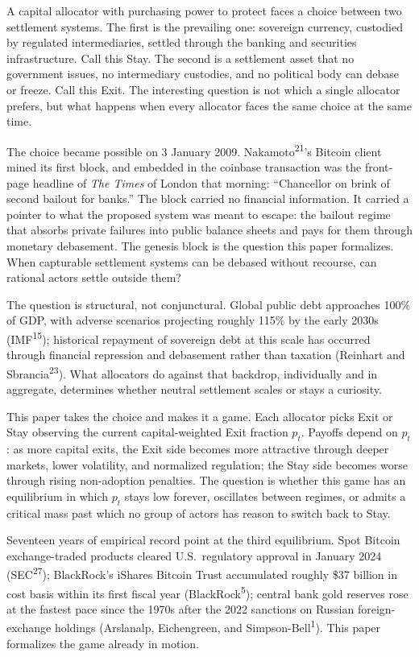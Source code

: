\documentclass[12pt]{article}
\theoremstyle{definition}
\theoremstyle{remark}
\begin{document}
A capital allocator with purchasing power to protect faces a choice between two settlement systems. The first is the prevailing one: sovereign currency, custodied by regulated intermediaries, settled through the banking and securities infrastructure. Call this Stay. The second is a settlement asset that no government issues, no intermediary custodies, and no political body can debase or freeze. Call this Exit. The interesting question is not which a single allocator prefers, but what happens when every allocator faces the same choice at the same time.

The choice became possible on 3 January 2009. Nakamoto\textsuperscript{21}'s Bitcoin client mined its first block, and embedded in the coinbase transaction was the front-page headline of \emph{The Times} of London that morning: ``Chancellor on brink of second bailout for banks.'' The block carried no financial information. It carried a pointer to what the proposed system was meant to escape: the bailout regime that absorbs private failures into public balance sheets and pays for them through monetary debasement. The genesis block is the question this paper formalizes. When capturable settlement systems can be debased without recourse, can rational actors settle outside them?

The question is structural, not conjunctural. Global public debt approaches 100\% of GDP, with adverse scenarios projecting roughly 115\% by the early 2030s (IMF\textsuperscript{15}); historical repayment of sovereign debt at this scale has occurred through financial repression and debasement rather than taxation (Reinhart and Sbrancia\textsuperscript{23}). What allocators do against that backdrop, individually and in aggregate, determines whether neutral settlement scales or stays a curiosity.

This paper takes the choice and makes it a game. Each allocator picks Exit or Stay observing the current capital-weighted Exit fraction $p_t$. Payoffs depend on $p_t$: as more capital exits, the Exit side becomes more attractive through deeper markets, lower volatility, and normalized regulation; the Stay side becomes worse through rising non-adoption penalties. The question is whether this game has an equilibrium in which $p_t$ stays low forever, oscillates between regimes, or admits a critical mass past which no group of actors has reason to switch back to Stay.

Seventeen years of empirical record point at the third equilibrium. Spot Bitcoin exchange-traded products cleared U.S.\ regulatory approval in January 2024 (SEC\textsuperscript{27}); BlackRock's iShares Bitcoin Trust accumulated roughly \$37 billion in cost basis within its first fiscal year (BlackRock\textsuperscript{5}); central bank gold reserves rose at the fastest pace since the 1970s after the 2022 sanctions on Russian foreign-exchange holdings (Arslanalp, Eichengreen, and Simpson-Bell\textsuperscript{1}). This paper formalizes the game already in motion.
\end{document}
